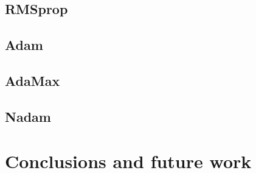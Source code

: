 \documentclass[a4paper]{article}
\begin{document}
\subsection{RMSprop}

\subsection{Adam}

\subsection{AdaMax}

\subsection{Nadam}

\section{Conclusions and future work}


\printbibliography
\end{document}
